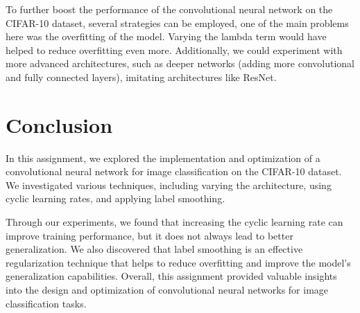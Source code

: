 \documentclass{article}
\begin{document}
To further boost the performance of the convolutional neural network on the CIFAR-10 dataset, several strategies can be employed, one of the main problems here was the overfitting of the model. Varying the lambda term would have helped to reduce overfitting even more. Additionally, we could experiment with more advanced architectures, such as deeper networks (adding more convolutional and fully connected layers), imitating architectures like ResNet.

\section{Conclusion}

In this assignment, we explored the implementation and optimization of a convolutional neural network for image classification on the CIFAR-10 dataset. We investigated various techniques, including varying the architecture, using cyclic learning rates, and applying label smoothing.

Through our experiments, we found that increasing the cyclic learning rate can improve training performance, but it does not always lead to better generalization. We also discovered that label smoothing is an effective regularization technique that helps to reduce overfitting and improve the model's generalization capabilities. Overall, this assignment provided valuable insights into the design and optimization of convolutional neural networks for image classification tasks.
\end{document}
